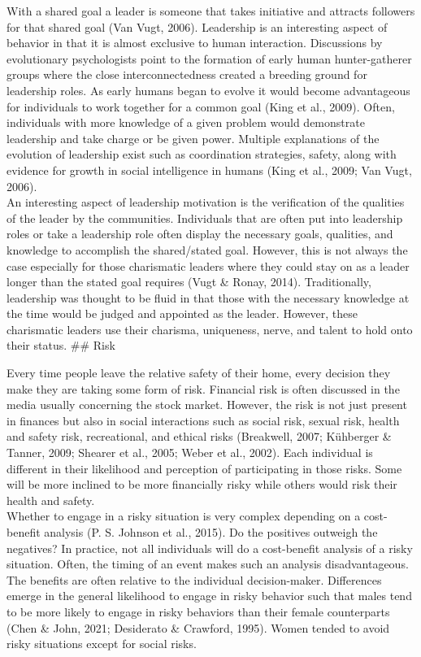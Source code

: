 \documentclass[
  donotrepeattitle,doc, 12pt, a4paper,floatsintext]{apa7}
\begin{document}
With a shared goal a leader is someone that takes initiative and attracts followers for that shared goal (Van Vugt, 2006). Leadership is an interesting aspect of behavior in that it is almost exclusive to human interaction. Discussions by evolutionary psychologists point to the formation of early human hunter-gatherer groups where the close interconnectedness created a breeding ground for leadership roles. As early humans began to evolve it would become advantageous for individuals to work together for a common goal (King et al., 2009). Often, individuals with more knowledge of a given problem would demonstrate leadership and take charge or be given power. Multiple explanations of the evolution of leadership exist such as coordination strategies, safety, along with evidence for growth in social intelligence in humans (King et al., 2009; Van Vugt, 2006).\\

An interesting aspect of leadership motivation is the verification of the qualities of the leader by the communities. Individuals that are often put into leadership roles or take a leadership role often display the necessary goals, qualities, and knowledge to accomplish the shared/stated goal. However, this is not always the case especially for those charismatic leaders where they could stay on as a leader longer than the stated goal requires (Vugt \& Ronay, 2014). Traditionally, leadership was thought to be fluid in that those with the necessary knowledge at the time would be judged and appointed as the leader. However, these charismatic leaders use their charisma, uniqueness, nerve, and talent to hold onto their status.
\#\# Risk

Every time people leave the relative safety of their home, every decision they make they are taking some form of risk. Financial risk is often discussed in the media usually concerning the stock market. However, the risk is not just present in finances but also in social interactions such as social risk, sexual risk, health and safety risk, recreational, and ethical risks (Breakwell, 2007; Kühberger \& Tanner, 2009; Shearer et al., 2005; Weber et al., 2002). Each individual is different in their likelihood and perception of participating in those risks. Some will be more inclined to be more financially risky while others would risk their health and safety.\\

Whether to engage in a risky situation is very complex depending on a cost-benefit analysis (P. S. Johnson et al., 2015). Do the positives outweigh the negatives? In practice, not all individuals will do a cost-benefit analysis of a risky situation. Often, the timing of an event makes such an analysis disadvantageous. The benefits are often relative to the individual decision-maker. Differences emerge in the general likelihood to engage in risky behavior such that males tend to be more likely to engage in risky behaviors than their female counterparts (Chen \& John, 2021; Desiderato \& Crawford, 1995). Women tended to avoid risky situations except for social risks.
\end{document}
